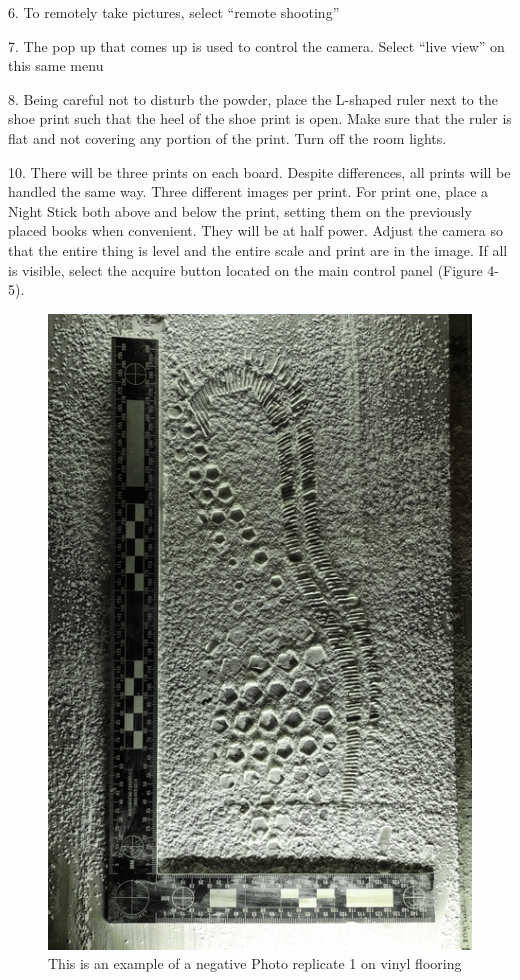 6. To remotely take pictures, select “remote shooting”

7. The pop up that comes up is used to control the camera. Select “live view” on this same menu

8. Being careful not to disturb the powder, place the L-shaped ruler next to the shoe print such that the heel of the shoe print is open. Make sure that the ruler is flat and not covering any portion of the print. Turn off the room lights.

10. There will be three prints on each board. Despite differences, all prints will be handled the same way. Three different images per print. For print one, place a Night Stick both above and below the print, setting them on the previously placed books when convenient. They will be at half power. Adjust the camera so that the entire thing is level and the entire scale and print are in the image. If all is visible, select the acquire button located on the main control panel (Figure 4-5).

\begin{figure}[!htp]
\centering
\includegraphics[scale=1.3, angle=180]{Vinyl1.png}
\caption{This is an example of a negative Photo replicate 1 on vinyl flooring}
\label{Figure 4}
\end{figure}


